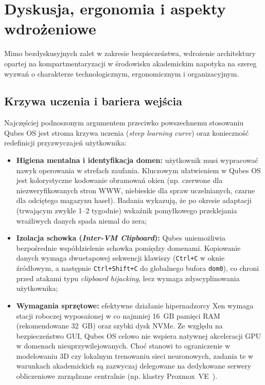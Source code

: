 \section{Dyskusja, ergonomia i aspekty wdrożeniowe}
\label{sec:dyskusja_i_wdrozenie}

Mimo bezdyskusyjnych zalet w zakresie bezpieczeństwa, wdrożenie architektury opartej na kompartmentaryzacji w środowisku akademickim napotyka na szereg wyzwań o charakterze technologicznym, ergonomicznym i organizacyjnym.

\subsection{Krzywa uczenia i bariera wejścia}
Najczęściej podnoszonym argumentem przeciwko powszechnemu stosowaniu Qubes OS jest stroma krzywa uczenia (\textit{steep learning curve}) oraz konieczność redefinicji przyzwyczajeń użytkownika:
\begin{itemize}
    \item \textbf{Higiena mentalna i identyfikacja domen:} użytkownik musi wypracować nawyk operowania w strefach zaufania. Kluczowym ułatwieniem w Qubes OS jest kolorystyczne kodowanie obramowań okien (np. czerwone dla niezweryfikowanych stron WWW, niebieskie dla spraw uczelnianych, czarne dla odciętego magazynu haseł). Badania wykazują, że po okresie adaptacji (trwającym zwykle 1--2 tygodnie) wskaźnik pomyłkowego przeklejania wrażliwych danych spada niemal do zera;
    \item \textbf{Izolacja schowka (\textit{Inter-VM Clipboard}):} Qubes uniemożliwia bezpośrednie współdzielenie schowka pomiędzy domenami. Kopiowanie danych wymaga dwuetapowej sekwencji klawiszy (\texttt{Ctrl+C} w oknie źródłowym, a następnie \texttt{Ctrl+Shift+C} do globalnego bufora \texttt{dom0}), co chroni przed atakami typu \textit{clipboard hijacking}, lecz wymaga zdyscyplinowania użytkownika;
    \item \textbf{Wymagania sprzętowe:} efektywne działanie hipernadzorcy Xen wymaga stacji roboczej wyposażonej w co najmniej 16~GB pamięci RAM (rekomendowane 32~GB) oraz szybki dysk NVMe. Ze względu na bezpieczeństwo GUI, Qubes OS celowo nie wspiera natywnej akceleracji GPU w domenach nieuprzywilejowanych. Choć stanowi to ograniczenie w modelowaniu 3D czy lokalnym trenowaniu sieci neuronowych, zadania te w warunkach akademickich są zazwyczaj delegowane na dedykowane serwery obliczeniowe zarządzane centralnie (np. klastry Proxmox~VE~\cite{zarnecki2026llm_proxmox}).
\end{itemize}

